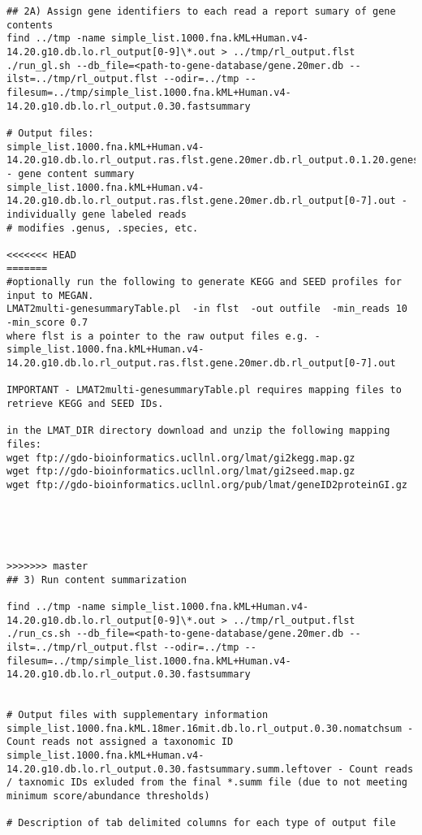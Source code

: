 \documentclass[11pt]{article}
\begin{document}
\begin{verbatim}
## 2A) Assign gene identifiers to each read a report sumary of gene contents
find ../tmp -name simple_list.1000.fna.kML+Human.v4-14.20.g10.db.lo.rl_output[0-9]\*.out > ../tmp/rl_output.flst
./run_gl.sh --db_file=<path-to-gene-database/gene.20mer.db --ilst=../tmp/rl_output.flst --odir=../tmp --filesum=../tmp/simple_list.1000.fna.kML+Human.v4-14.20.g10.db.lo.rl_output.0.30.fastsummary

# Output files:
simple_list.1000.fna.kML+Human.v4-14.20.g10.db.lo.rl_output.ras.flst.gene.20mer.db.rl_output.0.1.20.genesummary - gene content summary
simple_list.1000.fna.kML+Human.v4-14.20.g10.db.lo.rl_output.ras.flst.gene.20mer.db.rl_output[0-7].out - individually gene labeled reads
# modifies .genus, .species, etc.

<<<<<<< HEAD
=======
#optionally run the following to generate KEGG and SEED profiles for input to MEGAN.
LMAT2multi-genesummaryTable.pl  -in flst  -out outfile  -min_reads 10 -min_score 0.7
where flst is a pointer to the raw output files e.g. - simple_list.1000.fna.kML+Human.v4-14.20.g10.db.lo.rl_output.ras.flst.gene.20mer.db.rl_output[0-7].out

IMPORTANT - LMAT2multi-genesummaryTable.pl requires mapping files to retrieve KEGG and SEED IDs.

in the LMAT_DIR directory download and unzip the following mapping files:
wget ftp://gdo-bioinformatics.ucllnl.org/lmat/gi2kegg.map.gz
wget ftp://gdo-bioinformatics.ucllnl.org/lmat/gi2seed.map.gz
wget ftp://gdo-bioinformatics.ucllnl.org/pub/lmat/geneID2proteinGI.gz





>>>>>>> master
## 3) Run content summarization

find ../tmp -name simple_list.1000.fna.kML+Human.v4-14.20.g10.db.lo.rl_output[0-9]\*.out > ../tmp/rl_output.flst
./run_cs.sh --db_file=<path-to-gene-database/gene.20mer.db --ilst=../tmp/rl_output.flst --odir=../tmp --filesum=../tmp/simple_list.1000.fna.kML+Human.v4-14.20.g10.db.lo.rl_output.0.30.fastsummary


# Output files with supplementary information
simple_list.1000.fna.kML.18mer.16mit.db.lo.rl_output.0.30.nomatchsum - Count reads not assigned a taxonomic ID
simple_list.1000.fna.kML+Human.v4-14.20.g10.db.lo.rl_output.0.30.fastsummary.summ.leftover - Count reads / taxnomic IDs exluded from the final *.summ file (due to not meeting minimum score/abundance thresholds)

# Description of tab delimited columns for each type of output file


\end{verbatim}
\end{document}

